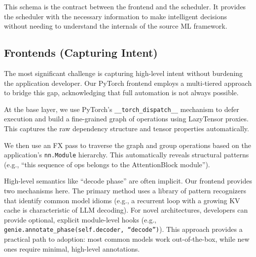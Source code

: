 This schema is the contract between the frontend and the scheduler.
It provides the scheduler with the necessary information to make intelligent decisions without needing to understand the internals of the source ML framework.


\subsection{Frontends (Capturing Intent)} %
\label{ssec:lazy_tensor}
The most significant challenge is capturing high-level intent without burdening the application developer. 
Our PyTorch frontend employs a multi-tiered approach to bridge this gap, acknowledging that full automation is not always possible.

At the base layer, we use PyTorch's \texttt{\_\_torch\_dispatch\_\_} mechanism to defer execution and build a fine-grained graph of operations using LazyTensor proxies. 
This captures the raw dependency structure and tensor properties automatically.

We then use an FX pass to traverse the graph and group operations based on the application's \texttt{nn.Module} hierarchy.
This automatically reveals structural patterns (e.g., ``this sequence of ops belongs to the AttentionBlock module'').

High-level semantics like ``decode phase'' are often implicit. 
Our frontend provides two mechanisms here. The primary method uses a library of pattern recognizers that identify common model idioms (e.g., a recurrent loop with a growing KV cache is characteristic of LLM decoding). For novel architectures, developers can provide optional, explicit module-level hooks (e.g., \texttt{genie.annotate\_phase(self.decoder, ``decode'')}). This approach provides a practical path to adoption: most common models work out-of-the-box, while new ones require minimal, high-level annotations.

